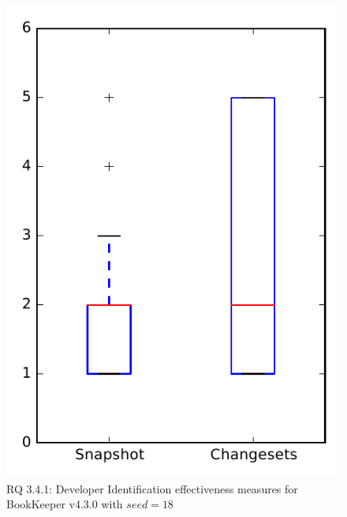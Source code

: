 
\begin{figure}
\centering
\includegraphics[height=0.4\textheight]{figures/dit_seed/rq1_bookkeeper_18}
\caption{RQ 3.4.1: Developer Identification effectiveness measures for BookKeeper v4.3.0 with $seed=18$}
\label{fig:dit_seed:rq1:bookkeeper}
\end{figure}
